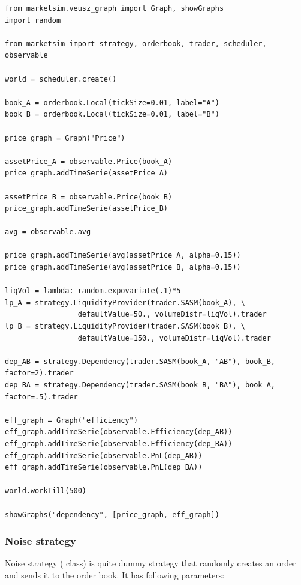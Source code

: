 \documentclass[a4paper,11pt]{article}
\newcommand{\tmtexttt}[1]{{\ttfamily{#1}}}
\begin{document}
\begin{verbatim}
from marketsim.veusz_graph import Graph, showGraphs
import random

from marketsim import strategy, orderbook, trader, scheduler, observable

world = scheduler.create()

book_A = orderbook.Local(tickSize=0.01, label="A")
book_B = orderbook.Local(tickSize=0.01, label="B")

price_graph = Graph("Price")
 
assetPrice_A = observable.Price(book_A)
price_graph.addTimeSerie(assetPrice_A)

assetPrice_B = observable.Price(book_B)
price_graph.addTimeSerie(assetPrice_B)

avg = observable.avg

price_graph.addTimeSerie(avg(assetPrice_A, alpha=0.15))
price_graph.addTimeSerie(avg(assetPrice_B, alpha=0.15))

liqVol = lambda: random.expovariate(.1)*5
lp_A = strategy.LiquidityProvider(trader.SASM(book_A), \
                 defaultValue=50., volumeDistr=liqVol).trader
lp_B = strategy.LiquidityProvider(trader.SASM(book_B), \
                 defaultValue=150., volumeDistr=liqVol).trader

dep_AB = strategy.Dependency(trader.SASM(book_A, "AB"), book_B, factor=2).trader
dep_BA = strategy.Dependency(trader.SASM(book_B, "BA"), book_A, factor=.5).trader

eff_graph = Graph("efficiency")
eff_graph.addTimeSerie(observable.Efficiency(dep_AB))
eff_graph.addTimeSerie(observable.Efficiency(dep_BA))
eff_graph.addTimeSerie(observable.PnL(dep_AB))
eff_graph.addTimeSerie(observable.PnL(dep_BA))

world.workTill(500)

showGraphs("dependency", [price_graph, eff_graph])
\end{verbatim}

\subsubsection{Noise strategy}

Noise strategy (\tmtexttt{strategy.Noise} class) is quite dummy strategy that randomly creates an order and sends it to the order book. It has following parameters:
\end{document}
